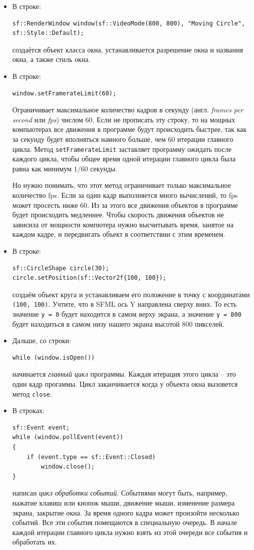 \documentclass{article}
\begin{document}
\begin{itemize}
\item В строке:
\begin{lstlisting}
sf::RenderWindow window(sf::VideoMode(800, 800), "Moving Circle", sf::Style::Default);
\end{lstlisting}
создаётся объект класса окна, устанавливается разрешение окна и названия окна, а также стиль окна.
\item В строке:
\begin{lstlisting}
window.setFramerateLimit(60);
\end{lstlisting}
Ограничивает максимальное количество кадров в секунду (англ. \textit{frames per second} или \textit{fps}) числом 60. Если не прописать эту строку, то на мощных компьютерах все движения в программе будут происходить быстрее, так как за секунду будет вполняться намного больше, чем 60 итерации главного цикла. Метод \texttt{setFramerateLimit} заставляет программу ожидать после каждого цикла, чтобы общее время одной итерации главного цикла была равна как минимум $1/60$ секунды.

Но нужно понимать, что этот метод ограничивает только максимальное количество fps. Если за один кадр выполняется много вычислений, то fps может просесть ниже 60. Из за этого все движения объектов в программе будет происходить медленнее. Чтобы скорость движения объектов не зависила от мощности компютера нужно высчитывать время, занятое на каждом кадре, и передвигать объект в соответствии с этим временем.


\item В строке:
\begin{lstlisting}
sf::CircleShape circle(30);
circle.setPosition(sf::Vector2f{100, 100});
\end{lstlisting}
создаём объект круга и устанавливаем его положение в точку с координатами \texttt{(100, 100)}. Учтите, что в SFML ось Y направлена сверху вних. То есть значение \texttt{y = 0} будет находится в самом верху экрана, а значение \texttt{y = 800} будет находиться в самом низу нашего экрана высотой 800 пикселей.


\item Дальше, со строки:
\begin{lstlisting}
while (window.isOpen())
\end{lstlisting}
начинается  \textit{главный цикл} программы. Каждая итерация этого цикла -- это один кадр прогаммы. Цикл заканчивается когда у объекта окна вызовется метод \texttt{close}.

\item В строках:
\begin{lstlisting}
sf::Event event;
while (window.pollEvent(event)) 
{
    if (event.type == sf::Event::Closed)
        window.close();
}
\end{lstlisting}
написан \textit{цикл обработки событий}. Событиями могут быть, например, нажатие клавиш или кнопок мыши, движение мыши, изменение размера экрана, закрытие окна. За время одного кадра может произойти несколько событий. Все эти события помещаются в специальную очередь. В начале каждой итерации главного цикла нужно взять из этой очереди все события и обработать их.


\end{itemize}
\end{document}
